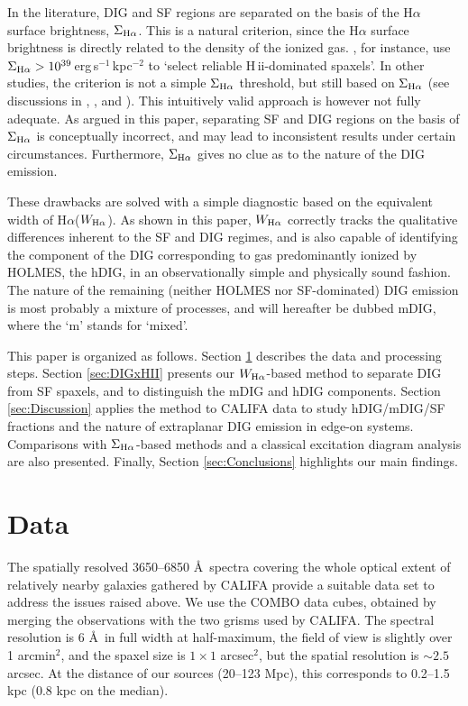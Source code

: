 \documentclass[a4paper, fleqn, usenatbib, useAMS]{mnras}
\newcommand{\Ha}{\ifmmode {\rm H}\alpha \else H$\alpha$\fi\xspace}
\newcommand{\hii}{H\,{\sc ii}\xspace}
\begin{document}
In the literature, DIG and SF regions are separated on the basis of the \Ha surface brightness, $\Sigma_{\Ha}$. This is a natural criterion, since the \Ha surface brightness is directly related to the density of the ionized gas. \cite{Zhang.etal.2017a}, for instance, use $\Sigma_{\Ha} > 10^{39}\,$erg$\,$s$^{-1}\,$kpc$^{-2}$ to `select reliable \hii-dominated spaxels'. In other studies, the criterion is not a simple $\Sigma_{\Ha}$ threshold, but still based on $\Sigma_{\Ha}$ (see discussions in \citealt{Zurita.etal.2000}, \citealt{Oey.etal.2007}, and \citealt{Vogt.etal.2017a}). This intuitively valid approach is however not fully adequate. As argued in this paper, separating SF and DIG regions on the basis of $\Sigma_{\Ha}$ is conceptually incorrect, and may lead to inconsistent results under certain circumstances. Furthermore, $\Sigma_{\Ha}$ gives no clue as to the nature of the DIG emission.

These drawbacks are solved with a simple diagnostic based on the equivalent width of \Ha ($W_{\Ha}$). As shown in this paper, $W_{\Ha}$ correctly tracks the qualitative differences inherent to the SF and DIG regimes, and is also capable of identifying the component of the DIG corresponding to gas predominantly ionized by HOLMES, the hDIG, in an observationally simple and physically sound fashion. The nature of the remaining (neither HOLMES nor SF-dominated) DIG emission is most probably a mixture of processes, and will hereafter be dubbed mDIG, where the `m' stands for `mixed'.

This paper is organized as follows. Section \ref{sec:Data} describes the data and processing steps. Section \ref{sec:DIGxHII} presents our $W_{\Ha}$-based method to separate DIG from SF spaxels, and to distinguish the mDIG and hDIG components. Section \ref{sec:Discussion} applies the method to CALIFA data to study hDIG/mDIG/SF fractions and the nature of extraplanar DIG emission in edge-on systems. Comparisons with  $\Sigma_{\Ha}$-based methods and a classical excitation diagram analysis are also presented. Finally, Section \ref{sec:Conclusions} highlights our main findings.

\section{Data}
\label{sec:Data}

The spatially resolved 3650--6850 \AA\ spectra covering the whole optical extent of relatively nearby galaxies gathered by CALIFA \citep{Sanchez.etal.2012a, SFSanchez.DR3.2016, Husemann.etal.2013a, GarciaBenito.etal.2015a} provide a suitable data set to address the issues raised above. We use the COMBO data cubes, obtained by merging the observations with the two grisms used by CALIFA. The spectral resolution is 6 \AA\ in full width at half-maximum, the field of view is slightly over 1 arcmin${}^2$, and the spaxel size is $1 \times 1$ arcsec$^2$, but the spatial resolution is $\sim 2.5$ arcsec. At the distance of our sources (20--123 Mpc), this corresponds to  0.2--1.5 kpc (0.8 kpc on the median).
\end{document}
